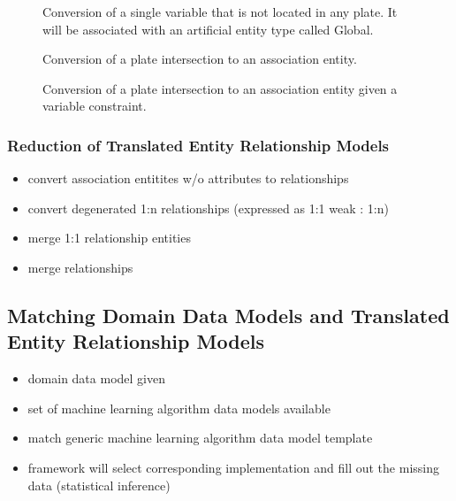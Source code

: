 \begin{figure}
\centering
\scalebox{\tikzScale}{\adjustTikzSize }
\caption{Conversion of a single variable that is not located in any plate. It will be associated with an artificial entity type called Global.}\label{fig:pm2erm_uno_global}
\end{figure}

\begin{figure}
\centering
\scalebox{\tikzScale}{\adjustTikzSize }
\caption{Conversion of a plate intersection to an association entity.}\label{fig:pm2erm_bi_noconstraints}
\end{figure}

\begin{figure}
\centering
\scalebox{\tikzScale}{\adjustTikzSize }
\caption{Conversion of a plate intersection to an association entity given a variable constraint.}\label{fig:pm2erm_bi_constraints}
\end{figure}

\subsubsection{Reduction of Translated Entity Relationship Models}

\begin{itemize}
\item convert association entitites w/o attributes to relationships
\item convert degenerated 1:n relationships (expressed as 1:1 weak : 1:n)
\item merge 1:1 relationship entities
\item merge relationships
\end{itemize}

\subsection{Matching Domain Data Models and Translated Entity Relationship Models}

\begin{itemize}
\item domain data model given
\item set of machine learning algorithm data models available
\item match generic machine learning algorithm data model template
\item framework will select corresponding implementation and fill out the missing data (statistical inference)
\end{itemize}

